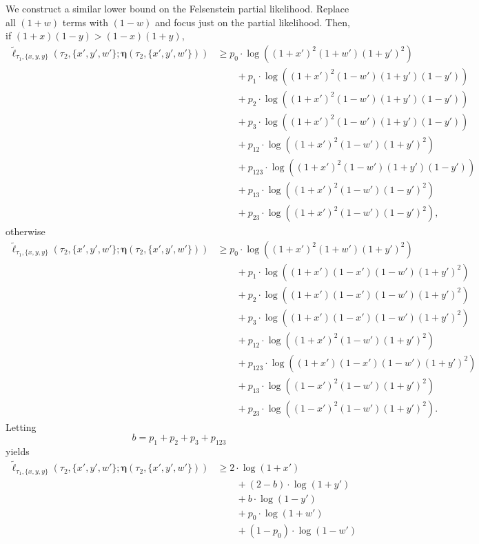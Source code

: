 \documentclass[a4paper]{article}
\newcommand{\fullAncestralSplitPartitions}{\boldsymbol\eta}
\begin{document}
We construct a similar lower bound on the Felsenstein partial likelihood.
Replace all $(1+w)$ terms with $(1-w)$ and focus just on the partial likelihood.
Then, if $(1+x)(1-y) > (1-x)(1+y)$,
\begin{align*}
    \tilde{\ell}_{\tau_1,\{x,y,y\}}(\tau_2, \{x',y',w'\}; \fullAncestralSplitPartitions(\tau_2,\{x',y',w'\}))
    &\ge      p_{0}  \cdot\log((1+x')^2   (1+w')(1+y')^2) \\
    &\qquad + p_{1}  \cdot\log((1+x')^2   (1-w')(1+y')(1-y')) \\
    &\qquad + p_{2}  \cdot\log((1+x')^2   (1-w')(1+y')(1-y')) \\
    &\qquad + p_{3}  \cdot\log((1+x')^2   (1-w')(1+y')(1-y')) \\
    &\qquad + p_{12} \cdot\log((1+x')^2   (1-w')(1+y')^2) \\
    &\qquad + p_{123}\cdot\log((1+x')^2   (1-w')(1+y')(1-y'))\\
    &\qquad + p_{13} \cdot\log((1+x')^2   (1-w')(1-y')^2) \\
    &\qquad + p_{23} \cdot\log((1+x')^2   (1-w')(1-y')^2),
\end{align*}
otherwise
\begin{align*}
    \tilde{\ell}_{\tau_1,\{x,y,y\}}(\tau_2, \{x',y',w'\}; \fullAncestralSplitPartitions(\tau_2,\{x',y',w'\}))
    &\ge      p_{0}  \cdot\log((1+x')^2    (1+w')(1+y')^2) \\
    &\qquad + p_{1}  \cdot\log((1+x')(1-x')(1-w')(1+y')^2) \\
    &\qquad + p_{2}  \cdot\log((1+x')(1-x')(1-w')(1+y')^2) \\
    &\qquad + p_{3}  \cdot\log((1+x')(1-x')(1-w')(1+y')^2) \\
    &\qquad + p_{12} \cdot\log((1+x')^2    (1-w')(1+y')^2) \\
    &\qquad + p_{123}\cdot\log((1+x')(1-x')(1-w')(1+y')^2)\\
    &\qquad + p_{13} \cdot\log((1-x')^2    (1-w')(1+y')^2) \\
    &\qquad + p_{23} \cdot\log((1-x')^2    (1-w')(1+y')^2).
\end{align*}
Letting
$$
b = p_{1}+p_{2}+p_{3}+p_{123}
$$
yields
\begin{align*}
    \tilde{\ell}_{\tau_1,\{x,y,y\}}(\tau_2, \{x',y',w'\}; \fullAncestralSplitPartitions(\tau_2,\{x',y',w'\}))
    &\ge      2\cdot\log(1+x') \\
    &\qquad + (2-b)  \cdot\log(1+y') \\
    &\qquad + b      \cdot\log(1-y') \\
    &\qquad + p_{0}\cdot\log(1+w') \\
    &\qquad + (1-p_{0})\cdot\log(1-w')
\end{align*}
\end{document}
